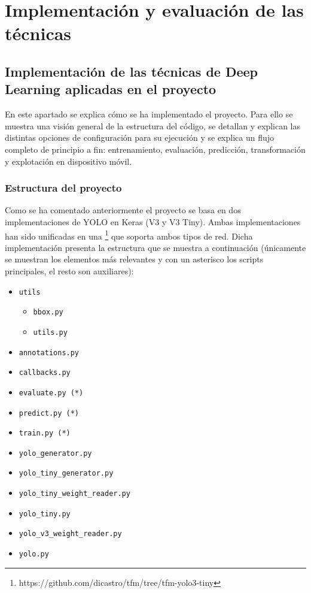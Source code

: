 \section{Implementación y evaluación de las técnicas}
\label{sec:implementacion_y_evaluacion_de_las_tecnicas}

\subsection{Implementación de las técnicas de Deep Learning aplicadas en el proyecto}

En este apartado se explica cómo se ha implementado el proyecto. Para ello se muestra una visión general de la estructura del código, se detallan y explican las distintas opciones de configuración para su ejecución y se explica un flujo completo de principio a fin: entrenamiento, evaluación, predicción, transformación y explotación en dispositivo móvil.

\subsubsection*{Estructura del proyecto}

Como se ha comentado anteriormente el proyecto se basa en dos implementaciones de YOLO en Keras (V3 y V3 Tiny). Ambas implementaciones han sido unificadas en una \footnote{https://github.com/dicastro/tfm/tree/tfm-yolo3-tiny} que soporta ambos tipos de red. Dicha implementación presenta la estructura que se muestra a continuación (únicamente se muestran los elementos más relevantes y con un asterisco los scripts principales, el resto son auxiliares):

\begin{itemize}
	\item \texttt{utils}
	\begin{itemize}
		\item \texttt{bbox.py}
		\item \texttt{utils.py}
	\end{itemize}
	\item \texttt{annotations.py}
	\item \texttt{callbacks.py}
	\item \texttt{evaluate.py (*)}
	\item \texttt{predict.py (*)}
	\item \texttt{train.py (*)}
	\item \texttt{yolo\_generator.py}
	\item \texttt{yolo\_tiny\_generator.py}
	\item \texttt{yolo\_tiny\_weight\_reader.py}
	\item \texttt{yolo\_tiny.py}
	\item \texttt{yolo\_v3\_weight\_reader.py}
	\item \texttt{yolo.py}
\end{itemize}

